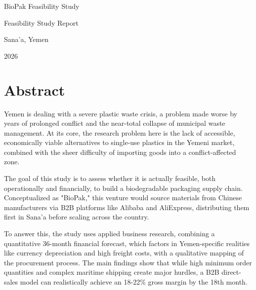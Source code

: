 \documentclass[12pt,a4paper]{article}
\begin{document}

\begin{titlepage}

\centering

\vspace*{2.2cm}

{\LARGE BioPak Feasibility Study\par}

\vspace{1.0cm}

{\Large Feasibility Study Report\par}

\vfill

{\large Sana'a, Yemen\par}

{\large 2026\par}

\end{titlepage}

\clearpage


\setcounter{page}{1}

\section*{Abstract}

Yemen is dealing with a severe plastic waste crisis, a problem made worse by years of prolonged conflict and the near-total collapse of municipal waste management. At its core, the research problem here is the lack of accessible, economically viable alternatives to single-use plastics in the Yemeni market, combined with the sheer difficulty of importing goods into a conflict-affected zone.

The goal of this study is to assess whether it is actually feasible, both operationally and financially, to build a biodegradable packaging supply chain. Conceptualized as "BioPak," this venture would source materials from Chinese manufacturers via B2B platforms like Alibaba and AliExpress, distributing them first in Sana'a before scaling across the country.

To answer this, the study uses applied business research, combining a quantitative 36-month financial forecast, which factors in Yemen-specific realities like currency depreciation and high freight costs, with a qualitative mapping of the procurement process. The main findings show that while high minimum order quantities and complex maritime shipping create major hurdles, a B2B direct-sales model can realistically achieve an 18-22\% gross margin by the 18th month.
\end{document}
